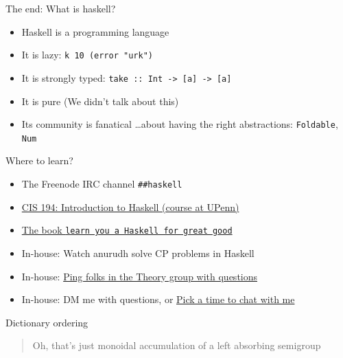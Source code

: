 \documentclass[8pt]{beamer}
\newcommand{\raw}[1]{\texttt{#1}}
\newcommand{\hs}[1]{\texttt{#1}}
\begin{document}
\begin{frame}[fragile]{The end: What is haskell?}
    \begin{itemize}
        \item Haskell is a programming language \pause
        \item It is lazy: \hs{k 10 (error "urk")} \pause
        \item It is strongly typed: \hs{take :: Int -> [a] -> [a]}\pause
        \item It is pure (We didn't talk about this)\pause
        \item Its community is fanatical \pause \dots  about having the right abstractions: \hs{Foldable}, \hs{Num} \pause
    \end{itemize}
    Where to learn?
    \begin{itemize}
        \item The Freenode IRC channel \raw{##haskell}\pause
        \item \href{https://www.seas.upenn.edu/~cis194/fall16/}{CIS 194: Introduction to Haskell (course at UPenn)} \pause
        \item \href{http://learnyouahaskell.com/}{The book \raw{learn you a Haskell for great good}} \pause
        \item In-house: Watch anurudh solve CP problems in Haskell\pause
        \item In-house: 
            \href{https://discord.com/invite/zK3a9n6?fbclid=IwAR1JaASmpgyc7T8w49E2aE-hr58ppwlr7QuZBK8Ssdk6Un9eXHYwUPm93-g}{Ping folks in the Theory group with questions}\pause
    \item In-house: DM me with questions, or \href{https://calendly.com/bollu/}{Pick a time to chat with me} \pause
    \end{itemize}
\end{frame}


\begin{frame}[fragile]{Dictionary ordering}
\begin{quote}
Oh, that's just monoidal accumulation of a left absorbing semigroup
\end{quote}
\end{frame}
\end{document}
